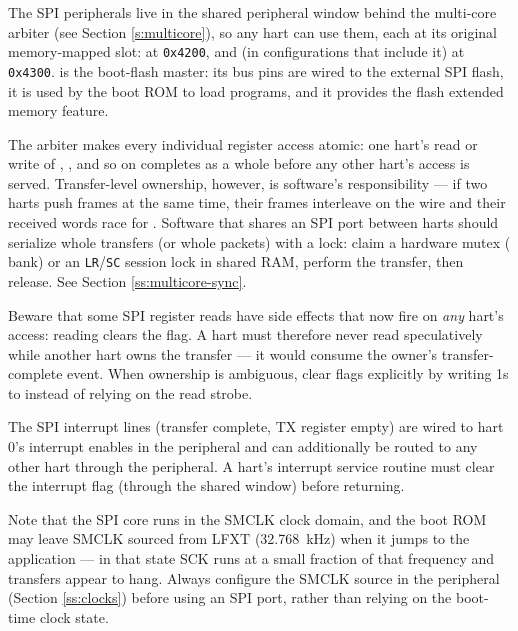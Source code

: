The SPI peripherals live in the shared peripheral window behind the multi-core arbiter (see Section \ref{s:multicore}), so any hart can use them, each at its original memory-mapped slot:  at \texttt{0x4200}, and  (in configurations that include it) at \texttt{0x4300}.  is the boot-flash master: its bus pins are wired to the external SPI flash, it is used by the boot ROM to load programs, and it provides the flash extended memory feature.

The arbiter makes every individual register access atomic: one hart's read or write of , , and so on completes as a whole before any other hart's access is served. Transfer-level ownership, however, is software's responsibility --- if two harts push frames at the same time, their frames interleave on the wire and their received words race for . Software that shares an SPI port between harts should serialize whole transfers (or whole packets) with a lock: claim a hardware mutex ( bank) or an \texttt{LR}/\texttt{SC} session lock in shared RAM, perform the transfer, then release. See Section \ref{ss:multicore-sync}.

Beware that some SPI register reads have side effects that now fire on \textit{any} hart's access: reading  clears the  flag. A hart must therefore never read  speculatively while another hart owns the transfer --- it would consume the owner's transfer-complete event. When ownership is ambiguous, clear flags explicitly by writing 1s to  instead of relying on the read strobe.

The SPI interrupt lines (transfer complete, TX register empty) are wired to hart 0's interrupt enables in the  peripheral and can additionally be routed to any other hart through the  peripheral. A hart's interrupt service routine must clear the interrupt flag (through the shared window) before returning.

Note that the SPI core runs in the SMCLK clock domain, and the boot ROM may leave SMCLK sourced from LFXT (32.768~\si{\kilo\hertz}) when it jumps to the application --- in that state SCK runs at a small fraction of that frequency and transfers appear to hang. Always configure the SMCLK source in the  peripheral (Section \ref{ss:clocks}) before using an SPI port, rather than relying on the boot-time clock state.

